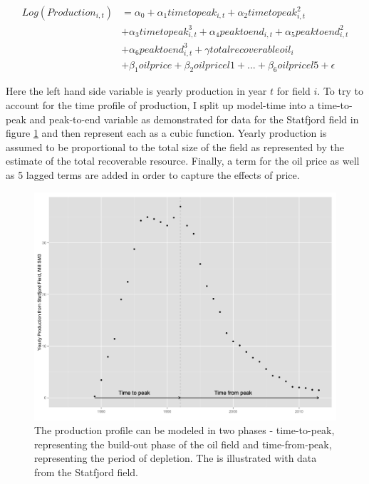 \documentclass[12pt]{article}
\begin{document}
	\begin{equation}
	\begin{split}	
	 Log(Production_{i,t})  &= \alpha_0 + \alpha_1 timetopeak_{i,t} + \alpha_2 timetopeak_{i,t}^2 \\
	  \quad & + \alpha_3 timetopeak_{i,t}^3  + \alpha_4 peaktoend_{i,t} + \alpha_5 peaktoend_{i,t}^2 \\
	  \quad & + \alpha_6 peaktoend_{i,t}^3 + \gamma totalrecoverableoil_i \\
	  \quad & + \beta_1 oilprice + \beta_2 oilpricel1 + ...+ \beta_6 oilpricel5 + \epsilon	
	\label{glm_eqn}
	\end{split}
	\end{equation}

Here the left hand side variable is yearly production in year $t$ for field $i$.  To try to account for the time profile of production, I split up model-time into a time-to-peak and peak-to-end variable as demonstrated for data for the Statfjord field in figure \ref{statfjord_dem} and then represent each as a cubic function.  Yearly production is assumed to be proportional to the total size of the field as represented by the estimate of the total recoverable resource.  Finally, a term for the oil price as well as 5 lagged terms are added in order to capture the effects of price.  

\begin{figure}
\includegraphics[width=1\textwidth]{figures/statfjord_dem_print.png}
\caption{The production profile can be modeled in two phases - time-to-peak, representing the build-out phase of the oil field and time-from-peak, representing the period of depletion. The is illustrated with data from the Statfjord field.}
\label{statfjord_dem}
\end{figure}
\end{document}

